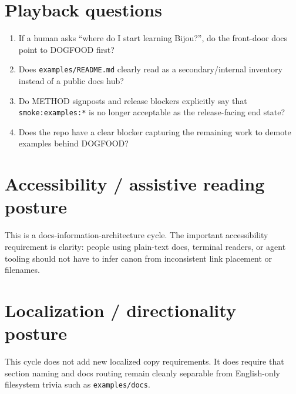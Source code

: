 \section{Playback questions}\label{record-086-playback-questions}

\begin{enumerate}
\def\labelenumi{\arabic{enumi}.}
\tightlist
\item
  If a human asks ``where do I start learning Bijou?'', do the front-door docs point to DOGFOOD first?
\item
  Does \texttt{e\allowbreak{}x\allowbreak{}a\allowbreak{}m\allowbreak{}p\allowbreak{}l\allowbreak{}e\allowbreak{}s\allowbreak{}/\allowbreak{}R\allowbreak{}E\allowbreak{}A\allowbreak{}D\allowbreak{}M\allowbreak{}E\allowbreak{}.\allowbreak{}m\allowbreak{}d} clearly read as a secondary/internal inventory instead of a public docs hub?
\item
  Do METHOD signposts and release blockers explicitly say that \texttt{s\allowbreak{}m\allowbreak{}o\allowbreak{}k\allowbreak{}e\allowbreak{}:\allowbreak{}e\allowbreak{}x\allowbreak{}a\allowbreak{}m\allowbreak{}p\allowbreak{}l\allowbreak{}e\allowbreak{}s\allowbreak{}:\allowbreak{}*} is no longer acceptable as the release-facing end state?
\item
  Does the repo have a clear blocker capturing the remaining work to demote examples behind DOGFOOD?
\end{enumerate}

\section{Accessibility / assistive reading posture}\label{record-086-accessibility-assistive-reading-posture}

This is a docs-information-architecture cycle. The important accessibility requirement is clarity: people using plain-text docs, terminal readers, or agent tooling should not have to infer canon from inconsistent link placement or filenames.

\section{Localization / directionality posture}\label{record-086-localization-directionality-posture}

This cycle does not add new localized copy requirements. It does require that section naming and docs routing remain cleanly separable from English-only filesystem trivia such as \texttt{e\allowbreak{}x\allowbreak{}a\allowbreak{}m\allowbreak{}p\allowbreak{}l\allowbreak{}e\allowbreak{}s\allowbreak{}/\allowbreak{}d\allowbreak{}o\allowbreak{}c\allowbreak{}s}.

